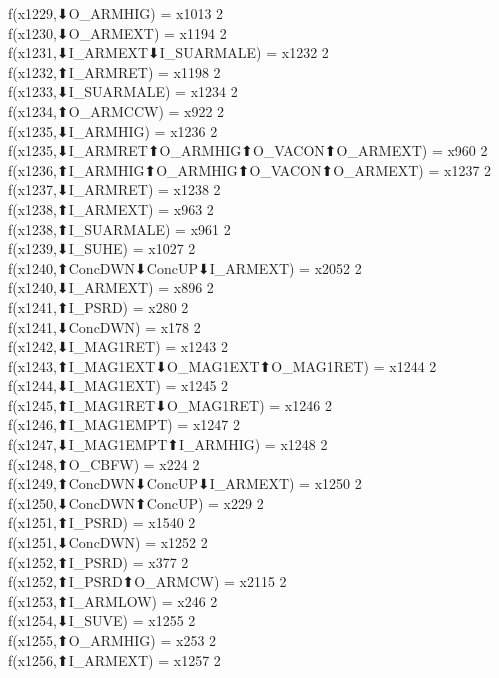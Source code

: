 f(x1229,⬇O_ARMHIG) = x1013 {2} \\
f(x1230,⬇O_ARMEXT) = x1194 {2} \\
f(x1231,⬇I_ARMEXT⬇I_SUARMALE) = x1232 {2} \\
f(x1232,⬆I_ARMRET) = x1198 {2} \\
f(x1233,⬇I_SUARMALE) = x1234 {2} \\
f(x1234,⬆O_ARMCCW) = x922 {2} \\
f(x1235,⬇I_ARMHIG) = x1236 {2} \\
f(x1235,⬇I_ARMRET⬆O_ARMHIG⬆O_VACON⬆O_ARMEXT) = x960 {2} \\
f(x1236,⬆I_ARMHIG⬆O_ARMHIG⬆O_VACON⬆O_ARMEXT) = x1237 {2} \\
f(x1237,⬇I_ARMRET) = x1238 {2} \\
f(x1238,⬆I_ARMEXT) = x963 {2} \\
f(x1238,⬆I_SUARMALE) = x961 {2} \\
f(x1239,⬇I_SUHE) = x1027 {2} \\
f(x1240,⬆ConcDWN⬇ConcUP⬇I_ARMEXT) = x2052 {2} \\
f(x1240,⬇I_ARMEXT) = x896 {2} \\
f(x1241,⬆I_PSRD) = x280 {2} \\
f(x1241,⬇ConcDWN) = x178 {2} \\
f(x1242,⬇I_MAG1RET) = x1243 {2} \\
f(x1243,⬆I_MAG1EXT⬇O_MAG1EXT⬆O_MAG1RET) = x1244 {2} \\
f(x1244,⬇I_MAG1EXT) = x1245 {2} \\
f(x1245,⬆I_MAG1RET⬇O_MAG1RET) = x1246 {2} \\
f(x1246,⬆I_MAG1EMPT) = x1247 {2} \\
f(x1247,⬇I_MAG1EMPT⬆I_ARMHIG) = x1248 {2} \\
f(x1248,⬆O_CBFW) = x224 {2} \\
f(x1249,⬆ConcDWN⬇ConcUP⬇I_ARMEXT) = x1250 {2} \\
f(x1250,⬇ConcDWN⬆ConcUP) = x229 {2} \\
f(x1251,⬆I_PSRD) = x1540 {2} \\
f(x1251,⬇ConcDWN) = x1252 {2} \\
f(x1252,⬆I_PSRD) = x377 {2} \\
f(x1252,⬆I_PSRD⬆O_ARMCW) = x2115 {2} \\
f(x1253,⬆I_ARMLOW) = x246 {2} \\
f(x1254,⬇I_SUVE) = x1255 {2} \\
f(x1255,⬆O_ARMHIG) = x253 {2} \\
f(x1256,⬆I_ARMEXT) = x1257 {2} \\
